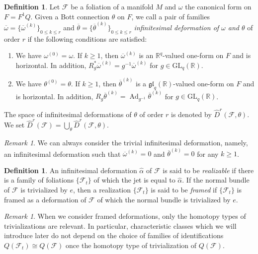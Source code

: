 \documentclass[12pt]{amsart}
\newcommand{\CF}{{\mathcal F}}
\newcommand{\R}{{\mathbb R}}
\newcommand{\gl}{\mathfrak{gl}}
\newcommand{\GL}{\mathrm{GL}}
\DeclareMathOperator{\Ad}{\mathrm{Ad}}
\theoremstyle{definition}
\newtheorem{definition}[theorem]{Definition}
\theoremstyle{remark}
\newtheorem{remark}[theorem]{Remark}
\begin{document}
\begin{definition}
\label{def3.9}
Let $\CF$ be a foliation of a manifold $M$ and $\omega$ the canonical form on $F=F^1Q$.
Given a Bott connection $\theta$ on $F$, we call a pair of families $\overline\omega=\{\overline\omega^{(k)}\}_{0\leq k\leq r}$ and $\overline\theta=\{\overline\theta^{(k)}\}_{0\leq k\leq r}$ \textit{infinitesimal deformation of $\omega$ and $\theta$} of order $r$ if the following conditions are satisfied:
\begin{enumerate}
\item
We have $\omega^{(0)}=\omega$.
If $k\geq1$, then $\overline{\omega}^{(k)}$ is an $\R^q$-valued one-form on $F$ and is horizontal.
In addition, $R_g^*\overline{\omega}^{(k)}=g^{-1}\overline{\omega}^{(k)}$ for $g\in\GL_q(\R)$.
\item
We have $\theta^{(0)}=\theta$.
If $k\geq1$, then $\overline{\theta}^{(k)}$ is a $\gl_q(\R)$-valued one-form on $F$ and is horizontal.
In addition, $R_g\overline{\theta}^{(k)}=\Ad_{g^{-1}}\overline{\theta}^{(k)}$ for $g\in\GL_q(\R)$.
\end{enumerate}
The space of infinitesimal deformations of $\theta$ of order $r$ is denoted by $\widehat{D}^r(\mathcal{F},\theta)$.
We set $\widehat{D}^r(\mathcal{F})=\bigcup_{\theta}\widehat{D}^r(\mathcal{F},\theta)$.
\end{definition}

\begin{remark}
We can always consider the trivial infinitesimal deformation, namely, an infinitesimal deformation such that $\overline\omega^{(k)}=0$ and $\overline\theta^{(k)}=0$ for any $k\geq1$.
\end{remark}

\begin{definition}
An infinitesimal deformation $\widehat\alpha$ of $\CF$ is said to be \textit{realizable} if there is a family of foliations $\{\CF_t\}$ of which the jet is equal to $\widehat\alpha$.
If the normal bundle of $\CF$ is trivialized by $e$, then a realization $\{\CF_t\}$ is said to be \textit{framed} if $\{\CF_t\}$ is framed as a deformation of $\CF$ of which the normal bundle is trivialized by $e$.
\end{definition}

\begin{remark}
When we consider framed deformations, only the homotopy types of trivializations are relevant.
In particular, characteristic classes which we will introduce later do not depend on the choice of families of identifications $Q(\CF_t)\cong Q(\CF)$ once the homotopy type of trivialization of $Q(\CF)$.
\end{remark}
\end{document}
